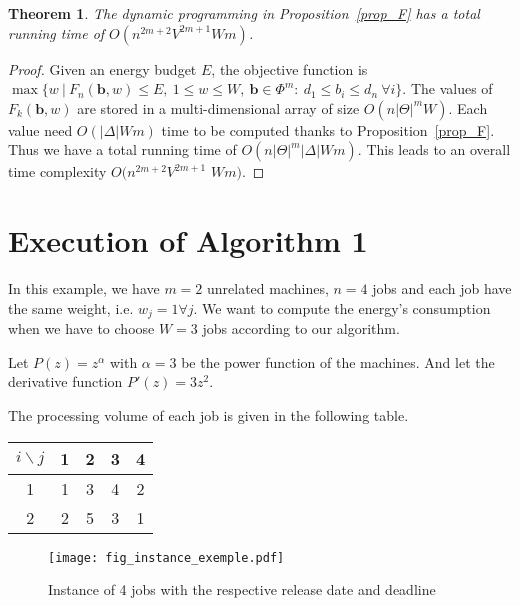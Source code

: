 \documentclass[11pt,a4paper]{article}
\newtheorem{theorem}{Theorem}
\newcommand{\vecteur}[1]{\ensuremath{\mathbf{#1}}}
\begin{document}
\begin{theorem}\label{prop_complexity_agreeable}
The dynamic programming in Proposition~\ref{prop_F} has a total running time of ${O(n^{2m+2}V^{2m+1} Wm)}$.
\end{theorem}


\begin{proof}
Given an energy budget $E$, the objective function is
$\max\{w~|~F_n({\vecteur{b},w}) \le E,~1\le w\le W,~\vecteur{b}\in \Phi^m:~d_{1} \le b_i\le d_{n}~\forall i\}$.
The values of $F_k(\vecteur{b},w)$ are stored in a multi-dimensional array of
size $O(n|\Theta|^{m}W)$.
Each value need $O(|\Delta|  Wm)$ time to be computed thanks to Proposition~\ref{prop_F}.
Thus we have a total running time of $O(n|\Theta|^{m} |\Delta| W m)$.
This leads to an overall time complexity $O(n^{2m+2}V^{2m+1}$ $Wm)$.
\end{proof}






 
\appendix
\section{Execution of Algorithm 1}

In this example, we have $m=2$ unrelated machines, $n =4$ jobs and each job have the same weight, i.e.
$w_j=1 \forall j$. We want to compute the energy's consumption when we have to choose 
$W=3$ jobs according to our algorithm.

Let $P(z)=z^\alpha$ with $\alpha=3$ be the power function of the machines.
And let the derivative function $P'(z)=3z^2$.

The processing volume of each job is given in the following table.
\begin{center}
\begin{tabular}{|c|c|c|c|c|}
\hline 
$i \backslash j$ & 1 & 2 & 3 & 4 \\ 
\hline 
1 & 1 & 3 & 4 & 2 \\ 
\hline 
2 & 2 & 5 & 3 & 1 \\ 
\hline 
\end{tabular} 
\end{center}

\begin{figure}[h]
\begin{center}
\texttt{[image: fig\_instance\_exemple.pdf]}
\caption{Instance of 4 jobs with the respective release date and deadline}
\label{exemple_appendix}
\end{center}
\end{figure}
\end{document}
